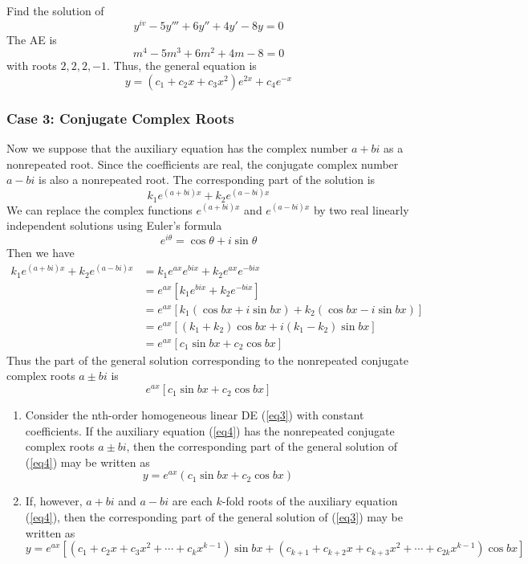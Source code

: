 \begin{example}{Find the solution of \[
    y^{iv} - 5y''' + 6y'' + 4y' - 8y = 0
\]}{}\vspace{-20pt}
    The AE is \[
        m^4 - 5m^3 + 6m^2 + 4m - 8 = 0
    \] with roots $2, 2, 2, -1$. Thus, the general equation is \[
        y = (c_1 + c_2x + c_3x^2)e^{2x} + c_4e^{-x}
    \]
\end{example}

\vspace{20pt}
\subsubsection{Case 3: Conjugate Complex Roots}

Now we suppose that the auxiliary equation has the complex number $a + bi$ as a nonrepeated root. Since the coefficients are real, the conjugate complex number $a - bi$ is also a nonrepeated root. The corresponding part of the solution is \[
    k_1e^{(a+bi)x} + k_2e^{(a-bi)x}
\]
We can replace the complex functions $e^{(a+bi)x}$ and $e^{(a-bi)x}$ by two real linearly independent solutions using Euler's formula \[
    e^{i\theta} = \cos{\theta} + i\sin{\theta}
\] Then we have
\begin{align*}
    k_1e^{(a+bi)x} + k_2e^{(a-bi)x} &= k_1e^{ax}e^{bix} + k_2e^{ax}e^{-bix} \\
    &= e^{ax}[ k_1e^{bix} + k_2e^{-bix} ] \\
    &= e^{ax}[ k_1(\cos{bx}+i\sin{bx}) + k_2(\cos{bx}-i\sin{bx}) ] \\
    &= e^{ax}[ (k_1+k_2)\cos{bx} + i(k_1-k_2)\sin{bx} ] \\
    &= e^{ax}[ c_1\sin{bx} + c_2\cos{bx} ]
\end{align*}
Thus the part of the general solution corresponding to the nonrepeated conjugate complex roots $a\pm bi$ is \[
    e^{ax}[c_1\sin{bx} + c_2\cos{bx}]
\]

\begin{theorem}{}{}
    \begin{enumerate}
        \item Consider the nth-order homogeneous linear DE (\ref{eq3}) with constant coefficients. If the auxiliary equation (\ref{eq4}) has the nonrepeated conjugate complex roots $a\pm bi$, then the corresponding part of the general solution of (\ref{eq4}) may be written as \[
            y = e^{ax}( c_1\sin{bx} + c_2\cos{bx} )
        \]
        \item If, however, $a+bi$ and $a-bi$ are each $k$-fold roots of the auxiliary equation (\ref{eq4}), then the corresponding part of the general solution of (\ref{eq3}) may be written as \[
                y = e^{ax}[ (c_1 + c_2x + c_3x^2 + \cdots + c_kx^{k-1})\sin{bx} + (c_{k+1} + c_{k+2}x + c_{k+3}x^2 + \cdots + c_{2k}x^{k-1})\cos{bx} ]
        \]
    \end{enumerate}
\end{theorem}

